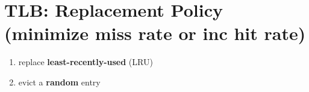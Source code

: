 \section*{TLB: Replacement Policy (minimize miss rate or inc hit rate)}
\begin{enumerate}
\item replace \textbf{least-recently-used} (LRU)
\item evict a \textbf{random} entry
\end{enumerate}
